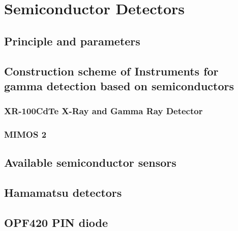 
\chapter{Semiconductor Detectors}


\section{Principle and parameters}
\section{Construction scheme of Instruments for gamma detection based on semiconductors}


\subsection{XR-100CdTe X-Ray and Gamma Ray Detector}

\subsection{MIMOS 2}


\section{Available semiconductor sensors}

\section{Hamamatsu detectors}

\section{OPF420 PIN diode}



